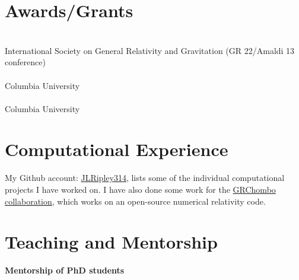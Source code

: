 \documentclass{my_cv}
\begin{document}
\section{Awards/Grants}
\noindent
{}
\\
International Society on General Relativity and Gravitation (GR 22/Amaldi 13 conference)
\\
\\
Columbia University
\\
\\
Columbia University
\section{Computational Experience}
   My Github account: \href{https://github.com/JLRipley314}{JLRipley314},
   lists some of the individual computational projects I have worked on.
   I have also done some work for the
   \href{https://www.grchombo.org/}{GRChombo collaboration}, 
   which works on an open-source numerical relativity code.
\section{Teaching and Mentorship}
{\bf Mentorship of PhD students}

\\ \indent
{}
\\ \indent
{}
\\ \indent
{}
\\ \indent
{}
\\ \indent
{}
\end{document}
